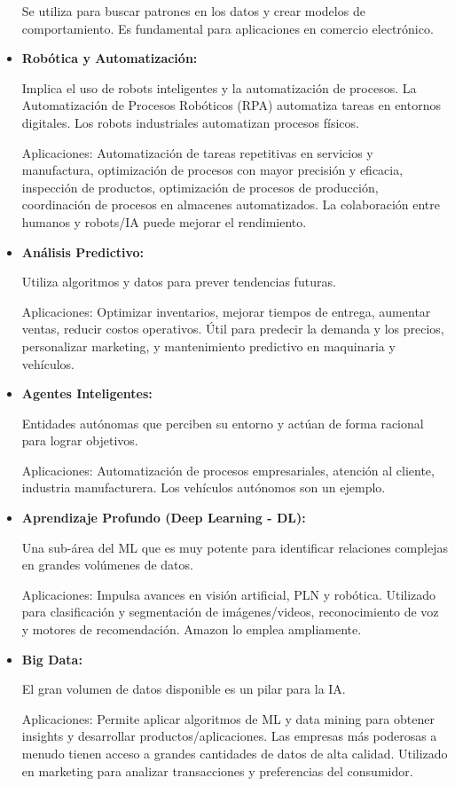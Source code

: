 \documentclass[12pt, a4paper, twoside]{article}
\begin{document}
\begin{itemize}
Se utiliza para buscar patrones en los datos y crear modelos de comportamiento. Es fundamental para aplicaciones en comercio electrónico.

\item \textbf{Robótica y Automatización:} 

Implica el uso de robots inteligentes y la automatización de procesos. La Automatización de Procesos Robóticos (RPA) automatiza tareas en entornos digitales. Los robots industriales automatizan procesos físicos.

Aplicaciones: Automatización de tareas repetitivas en servicios y manufactura, optimización de procesos con mayor precisión y eficacia, inspección de productos, optimización de procesos de producción, coordinación de procesos en almacenes automatizados. La colaboración entre humanos y robots/IA puede mejorar el rendimiento.
\item \textbf{Análisis Predictivo:} 

Utiliza algoritmos y datos para prever tendencias futuras.

Aplicaciones: Optimizar inventarios, mejorar tiempos de entrega, aumentar ventas, reducir costos operativos. Útil para predecir la demanda y los precios, personalizar marketing, y mantenimiento predictivo en maquinaria y vehículos.

\item \textbf{Agentes Inteligentes:} 

Entidades autónomas que perciben su entorno y actúan de forma racional para lograr objetivos.

Aplicaciones: Automatización de procesos empresariales, atención al cliente, industria manufacturera. Los vehículos autónomos son un ejemplo.

\item \textbf{Aprendizaje Profundo (Deep Learning - DL):} 

Una sub-área del ML que es muy potente para identificar relaciones complejas en grandes volúmenes de datos.

Aplicaciones: Impulsa avances en visión artificial, PLN y robótica. Utilizado para clasificación y segmentación de imágenes/videos, reconocimiento de voz y motores de recomendación. Amazon lo emplea ampliamente.

\item \textbf{Big Data:} 

El gran volumen de datos disponible es un pilar para la IA.

Aplicaciones: Permite aplicar algoritmos de ML y data mining para obtener insights y desarrollar productos/aplicaciones. Las empresas más poderosas a menudo tienen acceso a grandes cantidades de datos de alta calidad. Utilizado en marketing para analizar transacciones y preferencias del consumidor.
\end{itemize}
\end{document}
